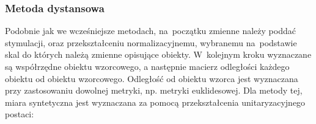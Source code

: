 \documentclass[12pt,a4paper]{report}
\begin{document}
%
%
%
%
%
%
%
%
%

\subsubsection{Metoda dystansowa}


Podobnie jak we wcześniejsze metodach, na~początku zmienne należy poddać stymulacji, oraz przekształceniu normalizacyjnemu, wybranemu na~podstawie skal do których należą zmienne opisujące obiekty. W~kolejnym kroku wyznaczane są współrzędne obiektu wzorcowego, a następnie macierz odległości każdego obiektu od obiektu wzorcowego. Odległość od obiektu wzorca jest wyznaczana przy zastosowaniu dowolnej metryki, np. metryki euklidesowej. %
Dla metody tej, miara syntetyczna jest wyznaczana za pomocą przekształcenia unitaryzacyjnego postaci: 
\end{document}
